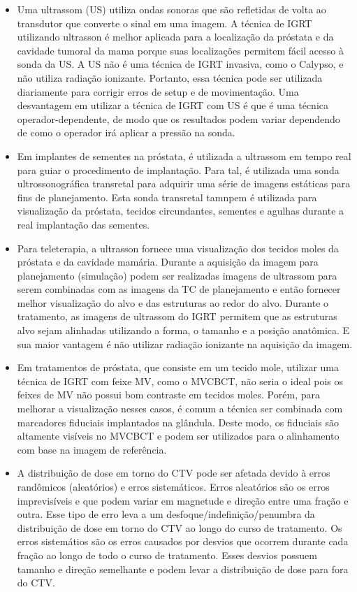 \documentclass[11pt,a4paper]{article}
\newcounter{exemplo}
\begin{document}
\begin{exemplo}[12. IGRT ]
\begin{itemize}
        \item Uma ultrassom (US) utiliza ondas sonoras que são refletidas de volta ao transdutor que converte o sinal em uma imagem. A técnica de IGRT utilizando ultrasson é melhor aplicada para a localização da próstata e da cavidade tumoral da mama porque suas localizações permitem fácil acesso à sonda da US. A US não é uma técnica de IGRT invasiva, como o Calypso, e não utiliza radiação ionizante. Portanto, essa técnica pode ser utilizada diariamente para corrigir erros de setup e de movimentação. Uma desvantagem em utilizar a técnica de IGRT com US é que é uma técnica operador-dependente, de modo que os resultados podem variar dependendo de como o operador irá aplicar a pressão na sonda. 
        
        \item Em implantes de sementes na próstata, é utilizada a ultrassom em tempo real para guiar o procedimento de implantação. Para tal, é utilizada uma sonda ultrossonográfica transretal para adquirir uma série de imagens estáticas para fins de planejamento. Esta sonda transretal tamnpem é utilizada para visualização da próstata, tecidos circundantes, sementes e agulhas durante a real implantação das sementes.
        
        \item Para teleterapia, a ultrasson fornece uma visualização dos tecidos moles da próstata e da cavidade mamária. Durante a aquisição da imagem para planejamento (simulação) podem ser realizadas imagens de ultrassom para serem combinadas com as imagens da TC de planejamento e então fornecer melhor visualização do alvo e das estruturas ao redor do alvo. Durante o tratamento, as imagens de ultrassom do IGRT permitem que as estruturas alvo sejam alinhadas utilizando a forma, o tamanho e a posição anatômica. E sua maior vantagem é não utilizar radiação ionizante na aquisição da imagem.
        
        \item Em tratamentos de próstata, que consiste em um tecido mole, utilizar uma técnica de IGRT com feixe MV, como o MVCBCT, não seria o ideal pois os feixes de MV não possui bom contraste em tecidos moles. Porém, para melhorar a visualização nesses casos, é comum a técnica ser combinada com marcadores fiduciais implantados na glândula. Deste modo, os fiduciais são altamente visíveis no MVCBCT e podem ser utilizados para o alinhamento com base na imagem de referência.
        
        \item A distribuição de dose em torno do CTV pode ser afetada devido à erros randômicos (aleatórios) e erros sistemáticos. Erros aleatórios são os erros imprevisíveis e que podem variar em magnetude e direção entre uma fração e outra. Esse tipo de erro leva a um desfoque/indefinição/penumbra da distribuição de dose em torno do CTV ao longo do curso de tratamento. Os erros sistemátios são os erros causados por desvios que ocorrem durante cada fração ao longo de todo o curso de tratamento. Esses desvios possuem tamanho e direção semelhante e podem levar a distribuição de dose para fora do CTV.
        

\end{itemize}
\end{exemplo}
\end{document}
